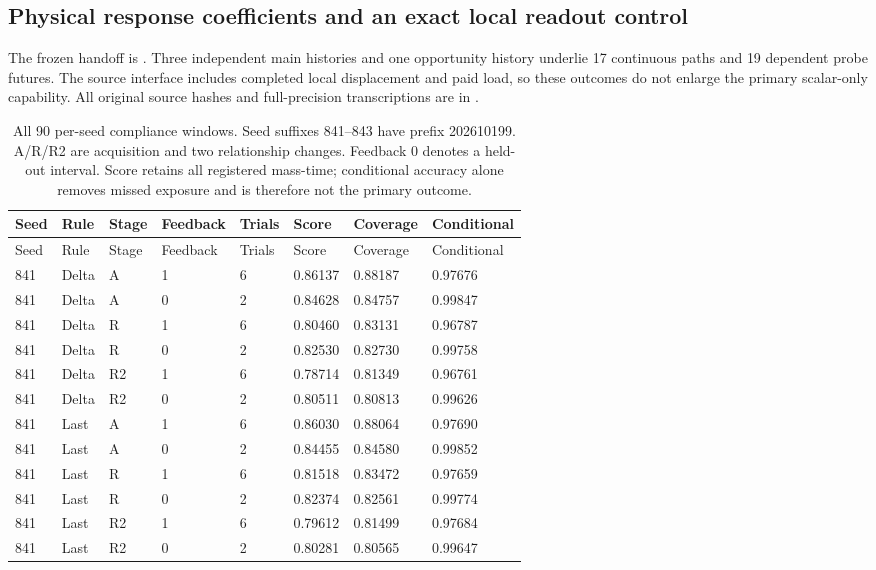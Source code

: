 \subsection*{Physical response coefficients and an exact local readout control}
The frozen handoff is . Three independent main histories and one opportunity history underlie 17 continuous paths and 19 dependent probe futures. The source interface includes completed local displacement and paid load, so these outcomes do not enlarge the primary scalar-only capability. All original source hashes and full-precision transcriptions are in .
\begingroup\scriptsize\setlength{\tabcolsep}{3pt}
\begin{longtable}{llllllll}
\caption{All 90 per-seed compliance windows. Seed suffixes 841--843 have prefix 202610199. A/R/R2 are acquisition and two relationship changes. Feedback 0 denotes a held-out interval. Score retains all registered mass-time; conditional accuracy alone removes missed exposure and is therefore not the primary outcome.}\label{tab:physical-state-stages}\\
\toprule
Seed & Rule & Stage & Feedback & Trials & Score & Coverage & Conditional \\
\midrule
\endfirsthead
\toprule
Seed & Rule & Stage & Feedback & Trials & Score & Coverage & Conditional \\
\midrule
\endhead
841 & Delta & A & 1 & 6 & 0.86137 & 0.88187 & 0.97676 \\
841 & Delta & A & 0 & 2 & 0.84628 & 0.84757 & 0.99847 \\
841 & Delta & R & 1 & 6 & 0.80460 & 0.83131 & 0.96787 \\
841 & Delta & R & 0 & 2 & 0.82530 & 0.82730 & 0.99758 \\
841 & Delta & R2 & 1 & 6 & 0.78714 & 0.81349 & 0.96761 \\
841 & Delta & R2 & 0 & 2 & 0.80511 & 0.80813 & 0.99626 \\
841 & Last & A & 1 & 6 & 0.86030 & 0.88064 & 0.97690 \\
841 & Last & A & 0 & 2 & 0.84455 & 0.84580 & 0.99852 \\
841 & Last & R & 1 & 6 & 0.81518 & 0.83472 & 0.97659 \\
841 & Last & R & 0 & 2 & 0.82374 & 0.82561 & 0.99774 \\
841 & Last & R2 & 1 & 6 & 0.79612 & 0.81499 & 0.97684 \\
841 & Last & R2 & 0 & 2 & 0.80281 & 0.80565 & 0.99647 \\

\end{longtable}
